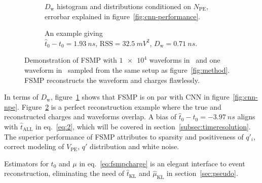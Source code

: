 \begin{figure}[H]
  \begin{subfigure}[b]{.45\textwidth}
    \centering
    \resizebox{1.05\textwidth}{!}{}
    \caption{\label{fig:fsmp-npe} $D_\mathrm{w}$ histogram and distributions conditioned on $N_{\mathrm{PE}}$, errorbar explained in figure~\ref{fig:cnn-performance}.}
  \end{subfigure}
  \hspace{0.5em}
  \begin{subfigure}[b]{.55\textwidth}
    \centering
    \resizebox{\textwidth}{!}{}
    \caption{\label{fig:fsmp} An example giving \\ $\hat{t}_0 - t_0=\SI{1.93}{ns}$, $\mathrm{RSS}=\SI{32.5}{mV^2}$, $D_\mathrm{w}=\SI{0.71}{ns}$.}
  \end{subfigure}
  \caption{\label{fig:fsmp-performance}Demonstration of FSMP with $\num[retain-unity-mantissa=false]{1e4}$ waveforms in~ and one waveform in~ sampled from the same setup as figure~\ref{fig:method}.  FSMP reconstructs the waveform and charges flawlessly.}
\end{figure}
In terms of $D_\mathrm{w}$, figure~\ref{fig:fsmp-npe} shows that FSMP is on par with CNN in figure~\ref{fig:cnn-npe}.  Figure~\ref{fig:fsmp} is a perfect reconstruction example where the true and reconstructed charges and waveforms overlap.  A bias of $\hat{t}_0 - t_0=\SI{-3.97}{ns}$ aligns with $\hat{t}_\mathrm{ALL}$ in eq.~\eqref{eq:2}, which will be covered in section~\ref{subsec:timeresolution}.  The superior performance of FSMP attributes to sparsity and positiveness of $q'_i$, correct modeling of $V_\mathrm{PE}$, $q'$ distribution and white noise.

Estimators for $t_0$ and $\mu$ in eq.~\eqref{eq:fsmpcharge} is an elegant interface to event reconstruction, eliminating the need of $\hat{t}_\mathrm{KL}$ and $\hat{\mu}_\mathrm{KL}$ in section~\ref{sec:pseudo}.
